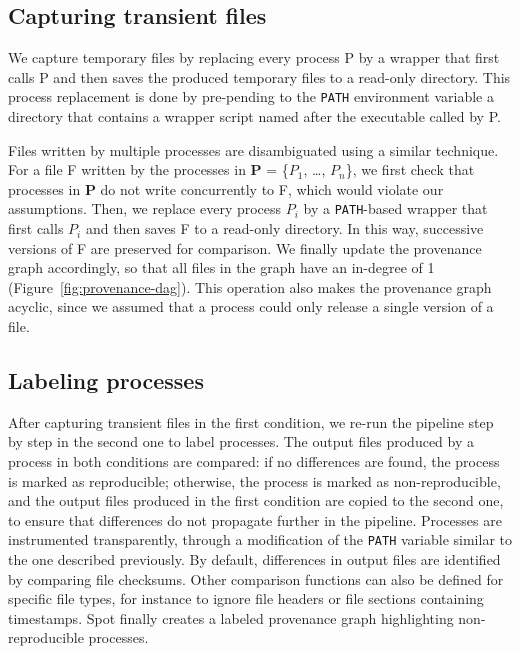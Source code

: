 \documentclass[a4paper,num-refs]{oup-contemporary}
\newcommand{\toolname}[0]{Spot\xspace}
\begin{document}
\subsection{Capturing transient files}

We capture temporary files by replacing every
process P by a wrapper that first calls P and then saves the produced
temporary files to a read-only directory. This process replacement is done by pre-pending
 to the \texttt{PATH} environment
variable a directory that contains a wrapper script named after the executable
called by P.

Files written by multiple processes are disambiguated using a similar technique. For a
 file F written by the processes in \textbf{P} = \{$P_{1}$, \ldots,
 $P_{n}$\}, we first check that processes in \textbf{P} do not
 write concurrently to F, which would violate our assumptions. Then, we
 replace every process $P_{i}$ by a \texttt{PATH}-based wrapper that first
 calls $P_{i}$ and then saves F to a read-only directory. In this way,
 successive versions of F are preserved for comparison. We finally
 update the provenance graph accordingly, so that all files in the graph
 have an in-degree of 1 (Figure~\ref{fig:provenance-dag}). This operation also makes the provenance graph
 acyclic, since we assumed that a process could only release a single version of a file.



\subsection{Labeling processes} 

After capturing transient files in the first condition, we re-run the pipeline
step by step in the second one to label processes. The output files
produced by a process in both conditions are compared: if no differences are found, the process is marked as
reproducible; otherwise, the process is marked as non-reproducible, and the
output files produced in the first condition are copied to the second one, to ensure
that differences do not propagate further in the pipeline. Processes are
instrumented transparently, through a modification of the \texttt{PATH}
variable similar to the one described previously. By default, differences
in output files are identified by comparing file checksums. Other
comparison functions can also be defined for specific file types, for
instance to ignore file headers or file sections containing timestamps.
\toolname finally creates a labeled
provenance graph highlighting non-reproducible processes.
\end{document}

